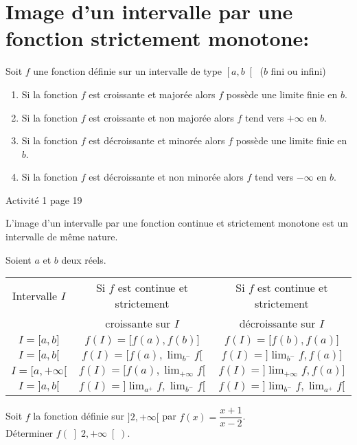 \documentclass[12pt,a4paper,x11names,usenames,dvipsnames,svgnames,oneside]{book}
\begin{document}
\section{Image d'un intervalle par une fonction strictement monotone:}
\begin{thr}
Soit $f$ une fonction définie sur un intervalle de type $\left[ {a,b} \right[$ ($b$ fini ou infini)
\begin{enumerate}
\item Si la fonction $f$ est croissante et majorée alors $f$ possède une limite finie en $b$.
\item Si la fonction $f$ est croissante et non majorée alors $f$ tend vers $+\infty$ en $b$.
\item Si la fonction $f$ est décroissante et minorée alors $f$ possède une limite finie en $b$.
\item Si la fonction $f$ est décroissante et non minorée alors $f$ tend vers $-\infty$ en $b$.
\end{enumerate}
\end{thr}
\begin{act}
Activité 1 page 19
\end{act}
\begin{thr}
L'image d'un intervalle par une fonction continue et strictement monotone est un intervalle de même nature.
\end{thr}
\begin{expl}
Soient $a$ et $b$ deux réels.
\begin{center}
\begin{tabular}{|c|c|c|}
\hline 
Intervalle $I$&Si $f$ est continue et strictement & Si $f$ est continue et strictement \\
 & croissante sur $I$& décroissante sur $I$\\
\hline
$I=\big[a,b\big]$&$f(I)=\big[f(a),f(b)\big]$&$f(I)=\big[f(b),f(a)\big]$\\
\hline
$I=\big[a,b\big[$&$f(I)=\big[f(a),\lim_{b^-}f\big[$&$f(I)=\big]\lim_{b^-}f,f(a)\big]$\\
\hline
$I=\big[a,+\infty\big[$&$f(I)=\big[f(a),\lim_{+\infty}f\big[$&$f(I)=\big]\lim_{+\infty}f,f(a)\big]$\\
\hline
$I=\big]a,b\big[$&$f(I)=\big]\lim_{a^+}f,\lim_{b^-}f\big[$&$f(I)=\big]\lim_{b^-}f,\lim_{a^+}f\big[$\\
\hline
\end{tabular}
\end{center}
\end{expl}
\begin{exr}
Soit $f$ la fonction définie sur $\big]2,+\infty\big[$ par $f(x)=\dfrac{x+1}{x-2}$.\\
Déterminer $f\left( {\left] {2, + \infty } \right[} \right)$.
\end{exr}
\end{document}
